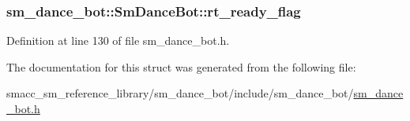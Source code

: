 \subsubsection[{\texorpdfstring{rt\+\_\+ready\+\_\+flag}{rt_ready_flag}}]{ sm\+\_\+dance\+\_\+bot\+::\+Sm\+Dance\+Bot\+::rt\+\_\+ready\+\_\+flag}\hypertarget{structsm__dance__bot_1_1SmDanceBot_a0f0587a13670ad8925555cd8f6cb6b2d}{}\label{structsm__dance__bot_1_1SmDanceBot_a0f0587a13670ad8925555cd8f6cb6b2d}


Definition at line 130 of file sm\+\_\+dance\+\_\+bot.\+h.



The documentation for this struct was generated from the following file\+:\begin{DoxyCompactItemize}
\item 
smacc\+\_\+sm\+\_\+reference\+\_\+library/sm\+\_\+dance\+\_\+bot/include/sm\+\_\+dance\+\_\+bot/\hyperlink{sm__dance__bot_8h}{sm\+\_\+dance\+\_\+bot.\+h}\end{DoxyCompactItemize}
